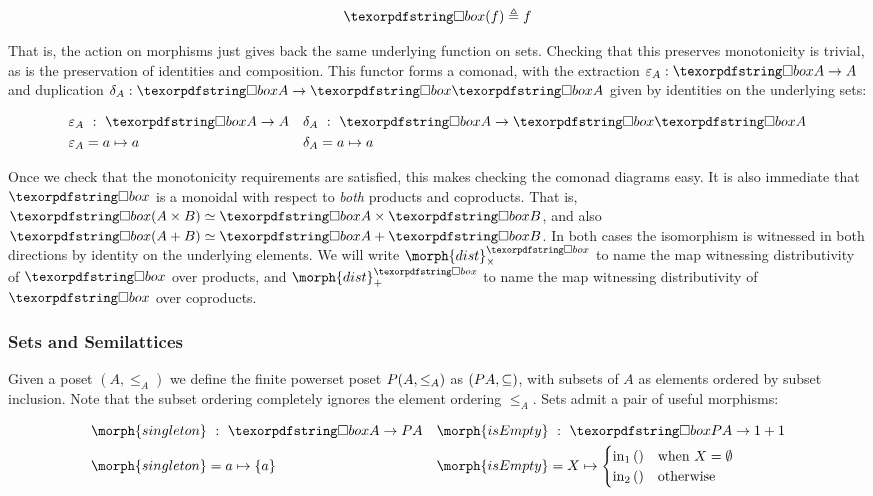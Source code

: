 \begin{displaymath}
  \iso(f) \triangleq f
\end{displaymath}

\noindent
That is, the action on morphisms just gives back the same underlying function on
sets. Checking that this preserves monotonicity is trivial, as is the
preservation of identities and composition. This functor forms a comonad, with
the extraction $\varepsilon_A : \iso A \to A$ and duplication $\delta_A : \iso A
\to \iso \iso A$ given by identities on the underlying sets:

\begin{align*}
  \varepsilon_A &\isa \iso A \to A
  &\delta_A &\isa \iso A \to \iso\iso A
  \\
  \varepsilon_A &= a \mapsto a & \delta_A &= a \mapsto a
\end{align*}

\noindent
Once we check that the monotonicity requirements are satisfied, this makes
checking the comonad diagrams easy. It is also immediate that $\iso$ is a
monoidal with respect to \emph{both} products and coproducts. That is, $\iso (A
\times B) \simeq \iso A \times \iso B$, and also $\iso (A + B) \simeq \iso A +
\iso B$. In both cases the isomorphism is witnessed in both directions by
identity on the underlying elements. We will write $\morph{dist}^\iso_\times$ to
name the map witnessing distributivity of $\iso$ over products, and
$\morph{dist}^\iso_+$ to name the map witnessing distributivity of $\iso$ over
coproducts.


\subsubsection{Sets and Semilattices}

Given a poset $(A, \leq_A)$ we define the finite powerset poset $P (A,
\leq_A)$ as $(P A, \subseteq)$, with subsets of $A$ as elements ordered by
subset inclusion.
%
Note that the subset ordering completely ignores the element ordering $\leq_A$.
%
Sets admit a pair of useful morphisms:

\begin{align*}
  \morph{singleton} &\isa \iso A \to \pfinof A
  &
  \morph{isEmpty} &\isa \iso \pfinof A \to \termO + \termO
  \\
  \morph{singleton} &= a \mapsto \{a\}
  &
  \morph{isEmpty} &= X \mapsto 
  \begin{cases}
    \inj 1 () &\text{when }X = \emptyset\\
    \inj 2 () &\text{otherwise}
  \end{cases}
\end{align*}

